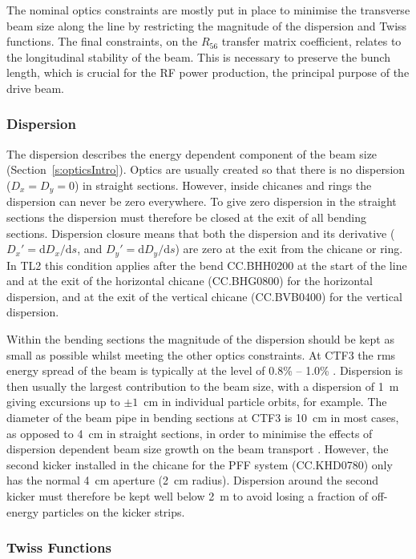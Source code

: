 The nominal optics constraints are mostly put in place to minimise the transverse beam size along the line by restricting the magnitude of the dispersion and Twiss functions. The final constraints, on the \(R_{56}\) transfer matrix coefficient, relates to the longitudinal stability of the beam. This is necessary to preserve the bunch length, which is crucial for the RF power production, the principal purpose of the drive beam.

\subsubsection{Dispersion}

The dispersion describes the energy dependent component of the beam size (Section~\ref{s:opticsIntro}). Optics are usually created so that there is no dispersion (\(D_{x} = D_{y} = 0\)) in straight sections. However, inside chicanes and rings the dispersion can never be zero everywhere. To give zero dispersion in the straight sections the dispersion must therefore be closed at the exit of all bending sections. Dispersion closure means that both the dispersion and its derivative (\(D_x' = \mathrm{d}D_x/\mathrm{d}s\), and \(D_y' = \mathrm{d}D_y/\mathrm{d}s\)) are zero at the exit from the chicane or ring. In TL2 this condition applies after the bend CC.BHH0200 at the start of the line and at the exit of the horizontal chicane (CC.BHG0800) for the horizontal dispersion, and at the exit of the vertical chicane (CC.BVB0400) for the vertical dispersion.

Within the bending sections the magnitude of the dispersion should be kept as small as possible whilst meeting the other optics constraints. At CTF3 the rms energy spread of the beam is typically at the  level of 0.8\% -- 1.0\% \cite{CTF3}. Dispersion is then usually the largest contribution to the beam size, with a dispersion of 1~m giving excursions up to \(\pm1\)~cm in individual particle orbits, for example. The diameter of the beam pipe in bending sections at CTF3 is 10~cm in most cases, as opposed to 4~cm in straight sections, in order to minimise the effects of dispersion dependent beam size growth on the beam transport \cite{CTF3}. However, the second kicker installed in the chicane for the PFF system (CC.KHD0780) only has the normal 4~cm aperture (2~cm radius).  Dispersion around the second kicker must therefore be kept well below 2~m to avoid losing a fraction of off-energy particles on the kicker strips.

\subsubsection{Twiss Functions}

